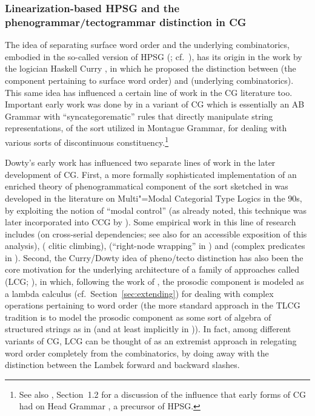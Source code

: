 \documentclass[output=paper
                ,modfonts
 	        ,biblatex
                ,babelshorthands
                ,newtxmath
                ,draftmode
                ,colorlinks, citecolor=brown
]{langscibook}
\begin{document}
\subsubsection{Linearization-based HPSG and the phenogrammar/tectogrammar distinction in CG }

The idea of separating surface word order and the underlying
combinatorics, embodied in the so-called 
version of HPSG (\citealt{Reape94a,Kathol2000a};
cf.\ ), has its origin 
in the work by the logician Haskell Curry \citeyearpar{curry61}, in which he
proposed the distinction between  (the component
pertaining to surface word order) and  (underlying
combinatorics). This same idea has influenced a certain line of work
in the CG literature too. Important early work was done by
\citeauthor{Dowty82a-u} \citeyearpar{Dowty82a-u,Dowty90a-Eng} in a variant of CG which is essentially an
AB Grammar with ``syncategorematic'' rules that directly manipulate
string representations, of the sort utilized in Montague Grammar, for
dealing with various sorts of discontinuous constituency.\footnote{See
also , Section~1.2 for a discussion of the influence
that early forms of CG \citep{Bach79a,Bach80a,Dowty82a-u,Dowty82b} had
on Head Grammar \citep{Pollard84a-u}, a precursor of HPSG.}

Dowty's early work has influenced two separate lines of work in the
later development of CG. First, a more formally sophisticated
implementation of an enriched theory of phenogrammatical component of
the sort sketched in \citet{Dowty90a-Eng} was developed in the
literature on Multi"=Modal Categorial Type Logics 
in the 90s, by exploiting the notion of ``modal control'' (as
already noted, this technique was  
later incorporated into CCG by \citealt[Chapter 5]{Baldridge2002a-u}). Some empirical
work in this line of research includes \citet{moortgatoehrle94} (on 
cross-serial dependencies; see also \citealt[Section~4]{Dowty97a-u} for an accessible
exposition of this analysis), \citet{kraak98} ( clitic climbing),
\citet{Whitman2009} (``right-node wrapping'' in ) and
\citet{kubota-diss,Kubota2014a-u} (complex predicates in ). Second,
the Curry/Dowty idea of pheno/tecto distinction has also been the core motivation for the
underlying architecture of
a family of approaches called  (LCG;
\citealt{oehrle1994,degroote01,muskens03,mihalicek-pollard10,pollard13}),
in which, following the work of \citet{oehrle1994},
the prosodic component is modeled as a lambda calculus
(cf.\ Section~\ref{sec:extending}) for
dealing with complex operations pertaining to word order
(the more standard approach in the TLCG tradition is to model the
prosodic component as some sort of algebra of structured strings as in
\citealt{morrill-ea11} (and at least implicitly in \citealt[Section~4]{moortgat1997})). 
In fact, among different variants of  
CG, LCG can be thought of as an extremist approach in
relegating word order completely from the combinatorics, by
doing away with the distinction between the Lambek forward and backward slashes.
\end{document}
